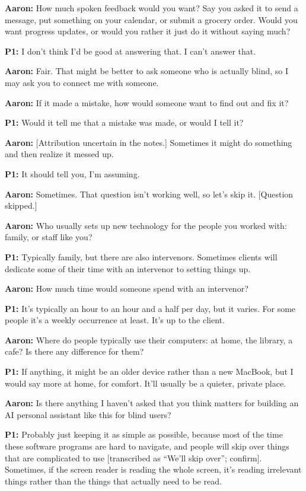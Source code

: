 \textbf{Aaron:} How much spoken feedback would you want? Say you asked it to send a message, put something on your calendar, or submit a grocery order. Would you want progress updates, or would you rather it just do it without saying much?

\textbf{P1:} I don't think I'd be good at answering that. I can't answer that.

\textbf{Aaron:} Fair. That might be better to ask someone who is actually blind, so I may ask you to connect me with someone.

\textbf{Aaron:} If it made a mistake, how would someone want to find out and fix it?

\textbf{P1:} Would it tell me that a mistake was made, or would I tell it?

\textbf{Aaron:} [Attribution uncertain in the notes.] Sometimes it might do something and then realize it messed up.

\textbf{P1:} It should tell you, I'm assuming.

\textbf{Aaron:} Sometimes. That question isn't working well, so let's skip it. [Question skipped.]

\textbf{Aaron:} Who usually sets up new technology for the people you worked with: family, or staff like you?

\textbf{P1:} Typically family, but there are also intervenors. Sometimes clients will dedicate some of their time with an intervenor to setting things up.

\textbf{Aaron:} How much time would someone spend with an intervenor?

\textbf{P1:} It's typically an hour to an hour and a half per day, but it varies. For some people it's a weekly occurrence at least. It's up to the client.

\textbf{Aaron:} Where do people typically use their computers: at home, the library, a cafe? Is there any difference for them?

\textbf{P1:} If anything, it might be an older device rather than a new MacBook, but I would say more at home, for comfort. It'll usually be a quieter, private place.

\textbf{Aaron:} Is there anything I haven't asked that you think matters for building an AI personal assistant like this for blind users?

\textbf{P1:} Probably just keeping it as simple as possible, because most of the time these software programs are hard to navigate, and people will skip over things that are complicated to use [transcribed as ``We'll skip over''; confirm]. Sometimes, if the screen reader is reading the whole screen, it's reading irrelevant things rather than the things that actually need to be read.

